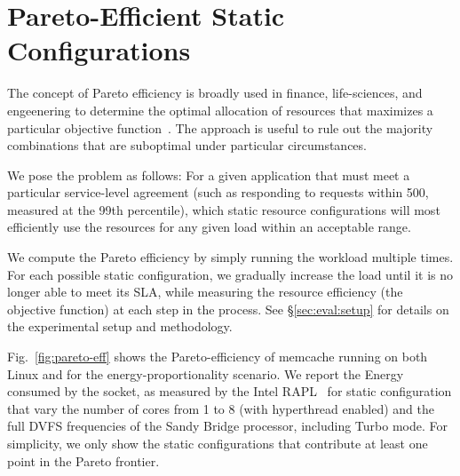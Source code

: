 
\section{Pareto-Efficient Static Configurations}
\label{sec:pareto}


The concept of Pareto efficiency is broadly used in finance,
life-sciences, and engeenering to determine the optimal allocation of
resources that maximizes a particular objective
function~\cite{wikipedia-pareto}.  The approach is useful to rule out
the majority combinations that are suboptimal under particular
circumstances.

We pose the problem as follows: For a given application that must meet
a particular service-level agreement (such as responding to requests
within 500\microsecond, measured at the 99th percentile), which static
resource configurations will most efficiently use the resources for
any given load within an acceptable range.

We compute the Pareto efficiency by simply running the workload
multiple times.  For each possible static configuration, we gradually
increase the load until it is no longer able to meet its SLA, while
measuring the resource efficiency (the objective function) at each
step in the process.   See \S\ref{sec:eval:setup} for details on the experimental setup and methodology. 



Fig.~\ref{fig:pareto-eff} shows the Pareto-efficiency of memcache
running on both Linux  and \ix for the energy-proportionality scenario.  We report
the Energy consumed by the socket, as measured by the Intel
RAPL~\cite{missing} for static configuration that vary the number of
cores from 1 to 8 (with hyperthread enabled) and the full DVFS
frequencies of the Sandy Bridge processor, including Turbo mode.  For
simplicity, we only show the static configurations that contribute at least one point in the Pareto frontier.

